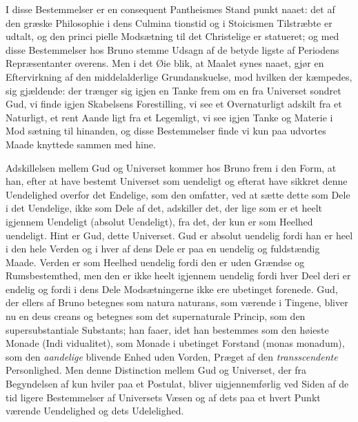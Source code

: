 \documentclass[12pt,a4paper]{book}
\begin{document}
I disse Bestemmelser er en consequent Pantheismes Stand\-%
punkt naaet: det af den græske Philosophie i dens Culmina\-%
tionstid og i Stoicismen Tilstræbte er udtalt, og den princi\-%
pielle Modsætning til det Christelige er statueret; og med
disse Bestemmelser hos Bruno stemme Udsagn af de betyde\-%
ligste af Periodens Repræsentanter overens. Men i det Øie\-%
blik, at Maalet synes naaet, gjør en Eftervirkning af den
middelalderlige Grundanskuelse, mod hvilken der kæmpedes, sig
gjældende: der trænger sig igjen en Tanke frem om en fra
Universet sondret Gud, vi finde igjen Skabelsens Forestilling,
vi see et Overnaturligt adskilt fra et Naturligt, et rent Aande\-%
ligt fra et Legemligt, vi see igjen Tanke og Materie i Mod\-%
sætning til hinanden, og disse Bestemmelser finde vi kun paa
udvortes Maade knyttede sammen med hine.

Adskillelsen mellem Gud og Universet kommer hos Bruno
frem i den Form, at han, efter at have bestemt Universet som
uendeligt og efterat have sikkret denne Uendelighed overfor
det Endelige, som den omfatter, ved at sætte dette som Dele
i det Uendelige, ikke som Dele af det, adskiller det, der lige\-%
som er et heelt igjennem Uendeligt (absolut Uendeligt), fra
det, der kun er som Heelhed uendeligt. Hint er Gud, dette
Universet. Gud er absolut uendelig fordi han er heel i den
hele Verden og i hver af dens Dele er paa en uendelig og
fuldstændig Maade. Verden er som Heelhed uendelig fordi
den er uden Grændse og Rumsbestemthed, men den er ikke
heelt igjennem uendelig fordi hver Deel deri er endelig og
fordi i dens Dele Modsætningerne ikke ere ubetinget forenede.
Gud, der ellers af Bruno betegnes som natura naturans, som
værende i Tingene, bliver nu en deus creans og betegnes som
det supernaturale Princip, som den supersubstantiale Substants;
han faaer, idet han bestemmes som den høieste Monade (Indi\-%
vidualitet), som Monade i ubetinget Forstand (monas monadum),
som den \emph{aandelige} blivende Enhed uden Vorden, Præget af
den \emph{transscendente} Personlighed. Men denne Distinction
mellem Gud og Universet, der fra Begyndelsen af kun hviler
paa et Postulat, bliver uigjennemførlig ved Siden af de tid\-%
ligere Bestemmelser af Universets Væsen og af dets paa et\-%
hvert Punkt værende Uendelighed og dets Udelelighed.
\end{document}
